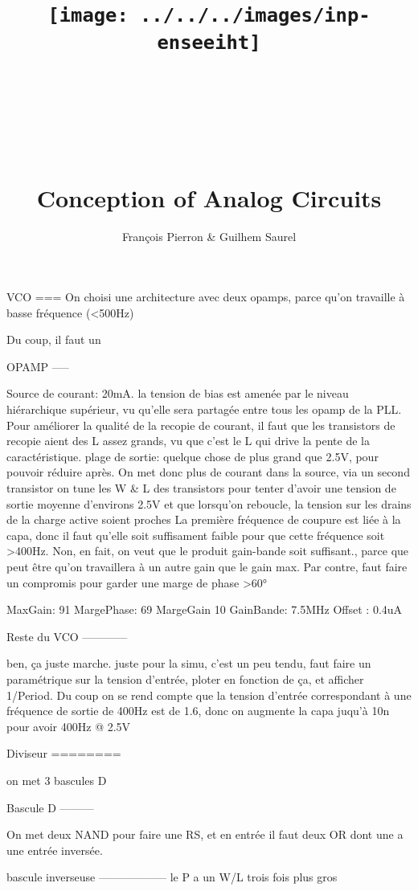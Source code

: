 \documentclass{article}
\title{\texttt{[image: ../../../images/inp-enseeiht]} \\ ~ \\ ~ \\ ~ \\ ~ \\ Conception of Analog Circuits}
\author{François Pierron \& Guilhem Saurel}
\date{\oldstylenums{\today}}
\begin{document}
\begin{titlepage}
    \setcounter{page}{0}
    \maketitle
    \vfill
    \tableofcontents
    \thispagestyle{empty}
\end{titlepage}

VCO
===
On choisi une architecture avec deux opamps, parce qu’on travaille à basse fréquence (<500Hz)

Du coup, il faut un 

OPAMP
-----

Source de courant: 20mA. la tension de bias est amenée par le niveau hiérarchique supérieur, vu qu’elle sera partagée entre tous les 
    opamp de la PLL. Pour améliorer la qualité de la recopie de courant, il faut que les transistors de recopie aient des L assez grands,
    vu que c’est le L qui drive la pente de la caractéristique.
plage de sortie: quelque chose de plus grand que 2.5V, pour pouvoir réduire après. On met donc plus de courant dans la source, via un 
    second transistor
on tune les W & L des transistors pour tenter d’avoir une tension de sortie moyenne d’environs 2.5V
    et que lorsqu’on reboucle, la tension sur les drains de la charge active soient proches
La première fréquence de coupure est liée à la capa, donc il faut qu’elle soit suffisament faible pour que cette fréquence soit >400Hz. Non, en fait, on veut que le produit gain-bande soit suffisant., parce que peut être qu’on travaillera à un autre gain que le gain max. Par contre, faut faire un compromis pour garder une marge de phase >60°

MaxGain: 91
MargePhase: 69
MargeGain 10
GainBande: 7.5MHz
Offset : 0.4uA

Reste du VCO
------------

ben, ça juste marche. juste pour la simu, c’est un peu tendu, faut faire un paramétrique sur la tension d’entrée, ploter en fonction de ça, et afficher 1/Period.
Du coup on se rend compte que la tension d’entrée correspondant à une fréquence de sortie de 400Hz est de 1.6, donc on augmente la capa juqu’à 10n pour avoir 400Hz @ 2.5V

Diviseur
========

on met 3 bascules D

Bascule D
---------

On met deux NAND pour faire une RS, et en entrée il faut deux OR dont une a une entrée inversée.

bascule inverseuse
------------------
le P a un W/L trois fois plus gros
\end{document}
